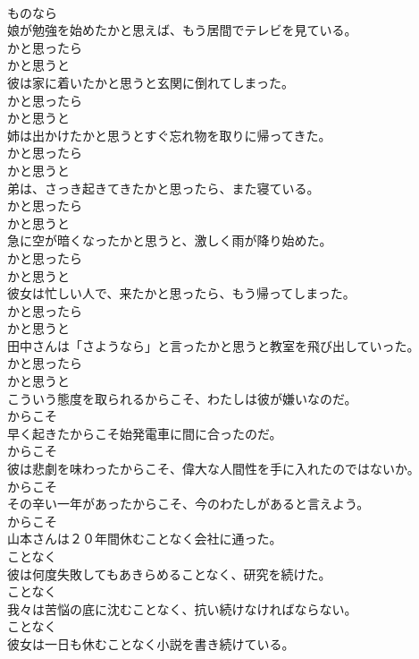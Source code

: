 \documentclass[8pt]{extreport}
\begin{document}
\begin{CJK}{UTF8}{min}
\\	ものなら
\\	娘が勉強を始めたかと思えば、もう居間でテレビを見ている。	
\\	かと思ったら 
\\	かと思うと
\\	彼は家に着いたかと思うと玄関に倒れてしまった。	
\\	かと思ったら 
\\	かと思うと
\\	姉は出かけたかと思うとすぐ忘れ物を取りに帰ってきた。	
\\	かと思ったら 
\\	かと思うと
\\	弟は、さっき起きてきたかと思ったら、また寝ている。	
\\	かと思ったら 
\\	かと思うと
\\	急に空が暗くなったかと思うと、激しく雨が降り始めた。	
\\	かと思ったら 
\\	かと思うと
\\	彼女は忙しい人で、来たかと思ったら、もう帰ってしまった。	
\\	かと思ったら 
\\	かと思うと
\\	田中さんは「さようなら」と言ったかと思うと教室を飛び出していった。	
\\	かと思ったら 
\\	かと思うと
\\	こういう態度を取られるからこそ、わたしは彼が嫌いなのだ。	
\\	からこそ
\\	早く起きたからこそ始発電車に間に合ったのだ。	
\\	からこそ
\\	彼は悲劇を味わったからこそ、偉大な人間性を手に入れたのではないか。	
\\	からこそ
\\	その辛い一年があったからこそ、今のわたしがあると言えよう。	
\\	からこそ
\\	山本さんは２０年間休むことなく会社に通った。	
\\	ことなく
\\	彼は何度失敗してもあきらめることなく、研究を続けた。	
\\	ことなく
\\	我々は苦悩の底に沈むことなく、抗い続けなければならない。	
\\	ことなく
\\	彼女は一日も休むことなく小説を書き続けている。	

\end{CJK}
\end{document}
